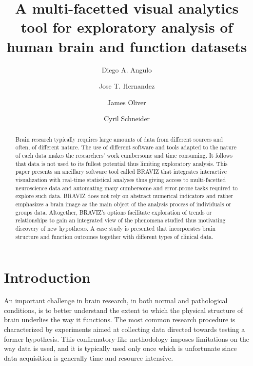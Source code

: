 \documentclass[twocolumn]{svjour3}
\begin{document}
\title{A multi-facetted visual analytics tool for exploratory analysis of human brain and function datasets} 

\author{Diego A. Angulo \and Jose T. Hernandez \and James Oliver \and Cyril Schneider}



\maketitle


\begin{abstract}
Brain research typically requires large amounts of data from different sources and often, of different nature. The use of different software and tools adapted to the nature of each data makes the researchers’ work cumbersome and time consuming. It follows that data is not used to its fullest potential thus limiting exploratory analysis. This paper presents an ancillary software tool called BRAVIZ that integrates interactive visualization with real-time statistical analyses thus giving access to multi-facetted neuroscience data and automating many cumbersome and error-prone tasks required to explore such data. BRAVIZ does not rely on abstract numerical indicators and rather emphasizes a brain image as the main object of the analysis process of individuals or groups data. Altogether, BRAVIZ’s options facilitate exploration of trends or relationships to gain an integrated view of the phenomena studied thus motivating discovery of new hypotheses. A case study is presented that incorporates brain structure and function outcomes together with different types of clinical data.
\end{abstract}

\section{Introduction}


An important challenge in brain research, in both normal and pathological conditions, is to better understand the extent to which the physical structure of brain underlies the way it functions. The most common research procedure is characterized by experiments aimed at collecting data directed towards testing a former hypothesis. This confirmatory-like methodology imposes limitations on the way data is used, and it is typically used only once which is unfortunate since data acquisition is generally time and resource intensive.
\end{document}
